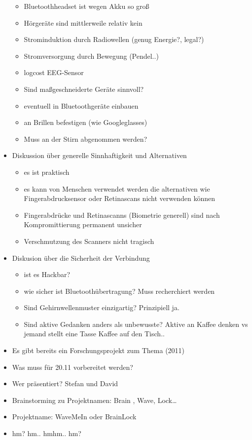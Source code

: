 \begin{itemize}
  \begin{itemize}
  \itemsep1pt\parskip0pt
  \item
    Bluetoothheadset ist wegen Akku so groß
  \item
    Hörgeräte sind mittlerweile relativ kein
  \item
    Strominduktion durch Radiowellen (genug Energie?, legal?)
  \item
    Stromversorgung durch Bewegung (Pendel..)
  \item
    logcost EEG-Sensor
  \item
    Sind maßgeschneiderte Geräte sinnvoll?
  \item
    eventuell in Bluetoothgeräte einbauen
  \item
    an Brillen befestigen (wie Googleglasses)
  \item
    Muss an der Stirn abgenommen werden?
  \end{itemize}
\item
  Diskussion über generelle Sinnhaftigkeit und Alternativen

  \begin{itemize}
  \itemsep1pt\parskip0pt
  \item
    es ist praktisch
  \item
    es kann von Menschen verwendet werden die alternativen wie
    Fingerabdrucksensor oder Retinascans nicht verwenden können
  \item
    Fingerabdrücke und Retinascanns (Biometrie generell) sind nach
    Kompromittierung permanent unsicher
  \item
    Verschmutzung des Scanners nicht tragisch
  \end{itemize}
\item
  Diskusion über die Sicherheit der Verbindung

  \begin{itemize}
  \itemsep1pt\parskip0pt
  \item
    ist es Hackbar?
  \item
    wie sicher ist Bluetoothübertragung? Muss recherchiert werden
  \item
    Sind Gehirnwellenmuster einzigartig? Prinzipiell ja.
  \item
    Sind aktive Gedanken anders als unbewusste? Aktive an Kaffee denken
    vs jemand stellt eine Tasse Kaffee auf den Tisch..
  \end{itemize}
\item
  Es gibt bereits ein Forschungsprojekt zum Thema (2011)
\item
  Was muss für 20.11 vorbereitet werden?
\item
  Wer präsentiert? Stefan und David
\item
  Brainstorming zu Projektnamen: Brain , Wave, Lock\ldots{}
\item
  Projektname: WaveMeIn oder BrainLock
\item
  hm? hm.. hmhm.. hm?
\end{itemize}
